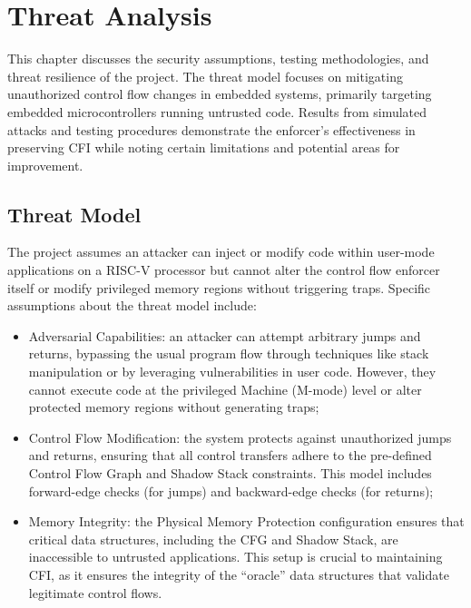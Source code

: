 \chapter{Threat Analysis}
\label{cha:ta}

This chapter discusses the security assumptions, testing methodologies, and
threat resilience of the project. The threat model focuses on mitigating unauthorized
control flow changes in embedded systems, primarily targeting embedded
microcontrollers running untrusted code. Results from simulated attacks and testing
procedures demonstrate the enforcer's effectiveness in preserving CFI while noting
certain limitations and potential areas for improvement.

\section{Threat Model}
\label{sec:ta_model}

The project assumes an attacker can inject or modify code within user-mode
applications on a RISC-V processor but cannot alter the control flow enforcer
itself or modify privileged memory regions without triggering traps. Specific assumptions
about the threat model include:

\begin{itemize}
  \item Adversarial Capabilities: an attacker can attempt arbitrary jumps and
    returns, bypassing the usual program flow through techniques like stack manipulation
    or by leveraging vulnerabilities in user code. However, they cannot execute code
    at the privileged Machine (M-mode) level or alter protected memory regions without
    generating traps;

  \item Control Flow Modification: the system protects against unauthorized
    jumps and returns, ensuring that all control transfers adhere to the pre-defined
    Control Flow Graph and Shadow Stack constraints. This model includes forward-edge
    checks (for jumps) and backward-edge checks (for returns);

  \item Memory Integrity: the Physical Memory Protection configuration ensures
    that critical data structures, including the CFG and Shadow Stack, are
    inaccessible to untrusted applications. This setup is crucial to maintaining
    CFI, as it ensures the integrity of the ``oracle'' data structures that
    validate legitimate control flows.
\end{itemize}

